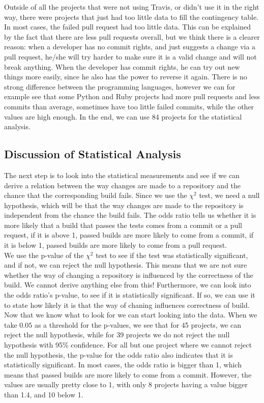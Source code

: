 \documentclass[a4paper,11pt]{article}
\begin{document}
			Outside of all the projects that were not using Travis, or didn't use it in the right way, there were projects that just had too little data to fill the contingency table. In most cases, the failed pull request had too little data. This can be explained by the fact that there are less pull requests overall, but we think there is a clearer reason: when a developer has no commit rights, and just suggests a change via a pull request, he/she will try harder to make sure it is a valid change and will not break anything. When the developer has commit rights, he can try out new things more easily, since he also has the power to reverse it again. There is no strong difference between the programming languages, however we can for example see that some Python and Ruby projects had more pull requests and less commits than average, sometimes have too little failed commits, while the other values are high enough. In the end, we can use 84 projects for the statistical analysis. \\
			
		\subsection{Discussion of Statistical Analysis}
			The next step is to look into the statistical measurements and see if we can derive a relation between the way changes are made to a repository and the chance that the corresponding build fails. Since we use the $\chi^2$ test, we need a null hypothesis, which will be that the way changes are made to the repository is independent from the chance the build fails. The odds ratio tells us whether it is more likely that a build that passes the tests comes from a commit or a pull request, if it is above 1, passed builds are more likely to come from a commit, if it is below 1, passed builds are more likely to come from a pull request. \\

			We use the p-value of the $\chi^2$ test to see if the test was statistically significant, and if not, we can reject the null hypothesis. This means that we are not sure whether the way of changing a repository is influenced by the correctness of the build. We cannot derive anything else from this! Furthermore, we can look into the odds ratio's p-value, to see if it is statistically significant. If so, we can use it to state how likely it is that the way of chaning influences correctness of build. \\
			
			Now that we know what to look for we can start looking into the data. When we take $0.05$ as a threshold for the p-values, we see that for 45 projects, we can reject the null hypothesis, while for 39 projects we do not reject the null hypothesis with 95\% confidence. For all but one project where we cannot reject the null hypothesis, the p-value for the odds ratio also indicates that it is statistically significant. In most cases, the odds ratio is bigger than 1, which means that passed builds are more likely to come from a commit. However, the values are usually pretty close to 1, with only 8 projects having a value bigger than 1.4, and 10 below 1.\\
\end{document}
